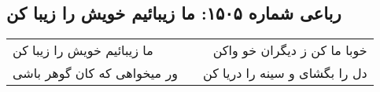 \begin{center}
\section*{رباعی شماره ۱۵۰۵: ما زیبائیم خویش را زیبا کن}
\label{sec:1505}
\begin{longtable}{l p{0.5cm} r}
ما زیبائیم خویش را زیبا کن
&&
خوبا ما کن ز دیگران خو واکن
\\
ور میخواهی که کان گوهر باشی
&&
دل را بگشای و سینه را دریا کن
\\
\end{longtable}
\end{center}
